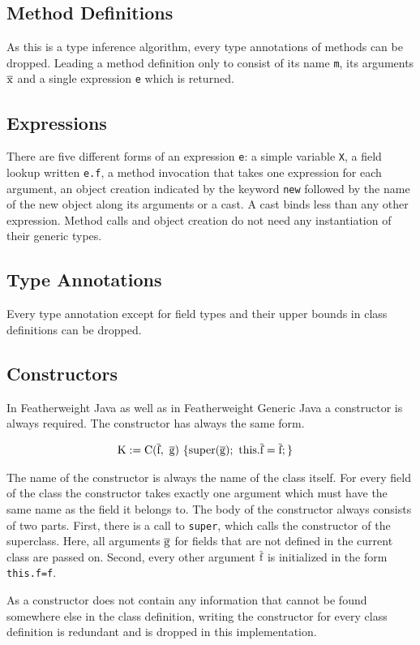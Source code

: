 \subsection{Method Definitions}

As this is a type inference algorithm, every type annotations of methods can be dropped. Leading a method definition only to consist of its name \verb|m|, its arguments $\overline{\text{x}}$ and a single expression \verb|e| which is returned.

\subsection{Expressions}

There are five different forms of an expression \verb|e|: a simple variable \verb|X|, a field lookup written \verb|e.f|, a method invocation that takes one expression for each argument, an object creation indicated by the keyword \verb|new| followed by the name of the new object along its arguments or a cast.
A cast binds less than any other expression. Method calls and object creation do not need any instantiation of their generic types.

\subsection{Type Annotations}

Every type annotation except for field types and their upper bounds in class definitions can be dropped.

\subsection{Constructors}
In Featherweight Java as well as in Featherweight Generic Java a constructor is always required. The constructor has always the same form.

\begin{align*}
    \text{K} &:= \text{C}(\overline{\text{f}}, \ \overline{\text{g}}) \ \{ \text{super}(\overline{\text{g}}); \ \text{this}.\overline{\text{f}}=\overline{\text{f}}; \}
\end{align*}

The name of the constructor is always the name of the class itself. For every field of the class the constructor takes exactly one argument which must have the same name as the field it belongs to.
The body of the constructor always consists of two parts. First, there is a call to \verb|super|, which calls the constructor of the superclass. Here, all arguments $\overline{\text{g}}$ for fields that are not defined in the current class are passed on.
Second, every other argument $\overline{\text{f}}$ is initialized in the form \verb|this.f=f|.

As a constructor does not contain any information that cannot be found somewhere else in the class definition, writing the constructor for every class definition is redundant and is dropped in this implementation.
